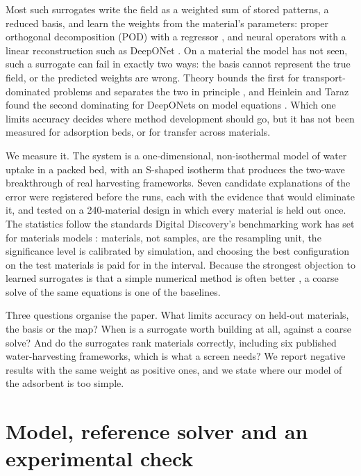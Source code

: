 \documentclass[10pt,a4paper]{article}
\begin{document}
Most such surrogates write the field as a weighted sum of stored patterns, a reduced
basis, and learn the weights from the material's parameters: proper orthogonal
decomposition (POD) with a regressor \cite{hesthaven2018non,bhattacharya2021model}, and
neural operators with a linear reconstruction such as DeepONet \cite{lu2021learning}. On a
material the model has not seen, such a surrogate can fail in exactly two ways: the
basis cannot represent the true field, or the predicted weights are wrong. Theory bounds
the first for transport-dominated problems \cite{lanthaler2023nonlinear} and separates
the two in principle \cite{bhattacharya2021model,wang2025rbdeeponet}, and Heinlein and
Taraz found the second dominating for DeepONets on model equations
\cite{heinlein2026error}. Which one limits accuracy decides where method development
should go, but it has not been measured for adsorption beds, or for transfer across
materials.

We measure it. The system is a one-dimensional, non-isothermal model of water uptake
in a packed bed, with an S-shaped isotherm that produces the two-wave breakthrough of
real harvesting frameworks. Seven candidate explanations of the error were registered
before the runs, each with the evidence that would eliminate it, and tested on a
240-material design in which every material is held out once. The statistics follow the
standards Digital Discovery's benchmarking work has set for materials models
\cite{witman2025matfold,abaei2026benchmark,burark2024codbench}: materials, not samples,
are the resampling unit, the significance level is calibrated by simulation, and choosing
the best configuration on the test materials is paid for in the interval. Because the
strongest objection to learned surrogates is that a simple numerical method is often
better \cite{mcgreivy2024weak,dehoop2022cost,huang2026cost}, a coarse solve of the same
equations is one of the baselines.

Three questions organise the paper. What limits accuracy on held-out materials, the
basis or the map? When is a surrogate worth building at all, against a coarse solve?
And do the surrogates rank materials correctly, including six published water-harvesting
frameworks, which is what a screen needs? We report negative results with the same
weight as positive ones, and we state where our model of the adsorbent is too simple.

\section{Model, reference solver and an experimental check}
\label{sec:model}
\end{document}
